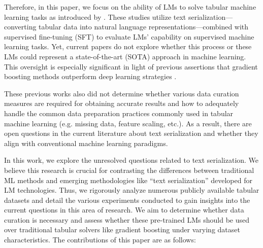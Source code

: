 \documentclass{article}
\theoremstyle{plain}
\theoremstyle{definition}
\theoremstyle{remark}
\begin{document}
Therefore, in this paper, we focus on the ability of LMs to solve tabular machine learning tasks as introduced by \citep{hegselmann2023tabllm, sahakyan2021explainable, dinh2022lift, fang2024large}. These studies utilize text serialization—converting tabular data into natural language representations—combined with supervised fine-tuning (SFT) to evaluate LMs' capability on supervised machine learning tasks. Yet, current papers do not explore whether this process or these LMs could represent a state-of-the-art (SOTA) approach in machine learning. This oversight is especially significant in light of previous assertions that gradient boosting methods outperform deep learning strategies \citep{grinsztajn2022tree}.

These previous works also did not determine whether various data curation measures are required for obtaining accurate results and how to adequately handle the common data preparation practices commonly used in tabular machine learning (e.g. missing data, feature scaling, etc.). As a result, there are open questions in the current literature about text serialization and whether they align with conventional machine learning paradigms.

In this work, we explore the unresolved questions related to text serialization. We believe this research is crucial for contrasting the differences between traditional ML methods and emerging methodologies like ``text serialization'' developed for LM technologies. Thus, we rigorously analyze numerous publicly available tabular datasets and detail the various experiments conducted to gain insights into the current questions in this area of research. We aim to determine whether data curation is necessary and assess whether these pre-trained LMs should be used over traditional tabular solvers like gradient boosting under varying dataset characteristics. The contributions of this paper are as follows:
\end{document}
